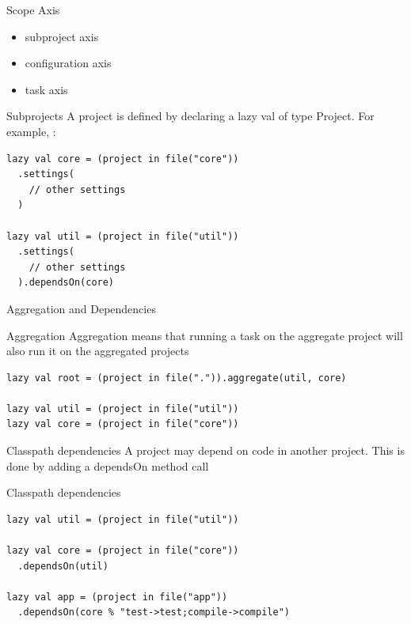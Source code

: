 \documentclass[aspectratio=169]{beamer}
\begin{document}
\begin{frame}{Scope Axis}
  \begin{itemize}
    \item subproject axis
    \item configuration axis
    \item task axis
  \end{itemize}
\end{frame}

\begin{frame}[fragile]{Subprojects}
  A project is defined by declaring a lazy val of type Project. For example, :
  \vspace{2em}
  \begin{verbatim}
lazy val core = (project in file("core"))
  .settings(
    // other settings
  )

lazy val util = (project in file("util"))
  .settings(
    // other settings
  ).dependsOn(core)
  \end{verbatim}
\end{frame}

\begin{frame}[fragile]{Aggregation and Dependencies}
\begin{block}{Aggregation}
Aggregation means that running a task on the aggregate project will also run it on the aggregated
projects
\end{block}
\begin{verbatim}
lazy val root = (project in file(".")).aggregate(util, core)

lazy val util = (project in file("util"))
lazy val core = (project in file("core"))
\end{verbatim}
\pause
\begin{block}{Classpath dependencies}
A project may depend on code in another project. This is done by adding a dependsOn method call
\end{block}
\end{frame}

\begin{frame}[fragile]{Classpath dependencies}
\begin{verbatim}
lazy val util = (project in file("util"))

lazy val core = (project in file("core"))
  .dependsOn(util)

lazy val app = (project in file("app"))
  .dependsOn(core % "test->test;compile->compile")
\end{verbatim}
\end{frame}
\end{document}
